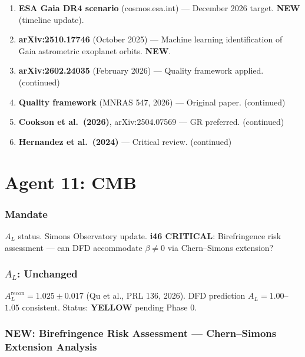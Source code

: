 \documentclass[11pt,a4paper]{article}
\newcommand{\YELLOW}{\textcolor{dfdyellow}{\textbf{YELLOW}}}
\newcommand{\NEW}{\textcolor{dfdblue}{\textbf{NEW}}}
\begin{document}
\begin{enumerate}
\item \textbf{ESA Gaia DR4 scenario} (cosmos.esa.int) --- December 2026 target. \NEW{} (timeline update).
\item \textbf{arXiv:2510.17746} (October 2025) --- Machine learning identification of Gaia astrometric exoplanet orbits. \NEW.
\item \textbf{arXiv:2602.24035} (February 2026) --- Quality framework applied. (continued)
\item \textbf{Quality framework} (MNRAS 547, 2026) --- Original paper. (continued)
\item \textbf{Cookson et al.\ (2026)}, arXiv:2504.07569 --- GR preferred. (continued)
\item \textbf{Hernandez et al.\ (2024)} --- Critical review. (continued)
\end{enumerate}


\part{Agent 11: CMB}
\label{part:agent11}

\section{Mandate}

$A_L$ status. Simons Observatory update. \textbf{i46 CRITICAL}: Birefringence risk assessment --- can DFD accommodate $\beta \neq 0$ via Chern--Simons extension?

\section{$A_L$: Unchanged}

$A_L^{\text{recon}} = 1.025 \pm 0.017$ (Qu et al., PRL 136, 2026). DFD prediction $A_L = 1.00$--$1.05$ consistent. Status: \YELLOW{} pending Phase 0.

\section{\NEW: Birefringence Risk Assessment --- Chern--Simons Extension Analysis}
\end{document}
